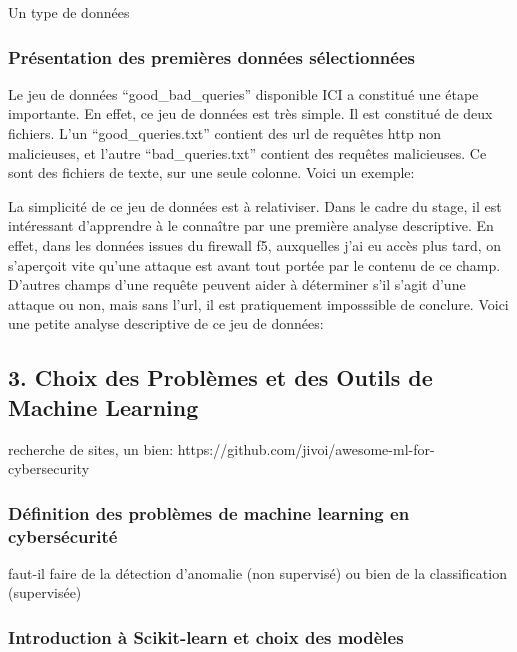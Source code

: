 \documentclass[
  letterpaper,
  DIV=11,
  numbers=noendperiod]{scrartcl}
\begin{document}
Un type de données

\subsubsection{Présentation des premières données
sélectionnées}\label{pruxe9sentation-des-premiuxe8res-donnuxe9es-suxe9lectionnuxe9es}

Le jeu de données ``good\_bad\_queries'' disponible ICI a constitué une
étape importante. En effet, ce jeu de données est très simple. Il est
constitué de deux fichiers. L'un ``good\_queries.txt'' contient des url
de requêtes http non malicieuses, et l'autre ``bad\_queries.txt''
contient des requêtes malicieuses. Ce sont des fichiers de texte, sur
une seule colonne. Voici un exemple:

La simplicité de ce jeu de données est à relativiser. Dans le cadre du
stage, il est intéressant d'apprendre à le connaître par une première
analyse descriptive. En effet, dans les données issues du firewall f5,
auxquelles j'ai eu accès plus tard, on s'aperçoit vite qu'une attaque
est avant tout portée par le contenu de ce champ. D'autres champs d'une
requête peuvent aider à déterminer s'il s'agit d'une attaque ou non,
mais sans l'url, il est pratiquement imposssible de conclure. Voici une
petite analyse descriptive de ce jeu de données:

\subsection{3. Choix des Problèmes et des Outils de Machine
Learning}\label{choix-des-probluxe8mes-et-des-outils-de-machine-learning}

recherche de sites, un bien:
https://github.com/jivoi/awesome-ml-for-cybersecurity

\subsubsection{Définition des problèmes de machine learning en
cybersécurité}\label{duxe9finition-des-probluxe8mes-de-machine-learning-en-cybersuxe9curituxe9}

faut-il faire de la détection d'anomalie (non supervisé) ou bien de la
classification (supervisée)

\subsubsection{Introduction à Scikit-learn et choix des
modèles}\label{introduction-uxe0-scikit-learn-et-choix-des-moduxe8les}
\end{document}
